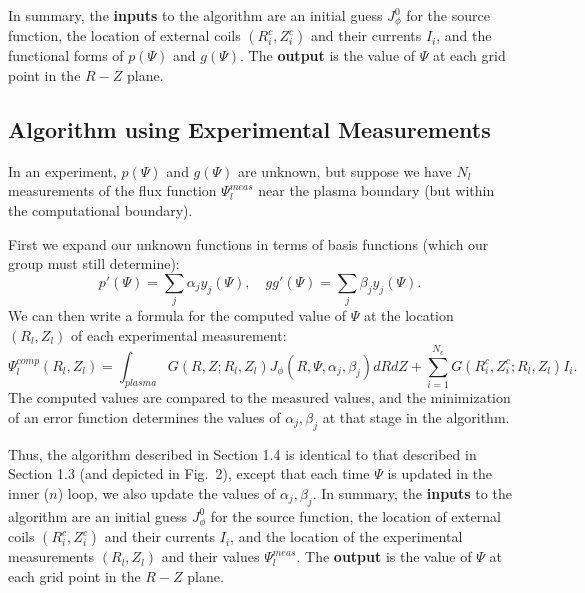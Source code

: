 \documentclass[paper=letter, fontsize=11pt]{scrartcl} %
\begin{document}
In summary, the \textbf{inputs} to the algorithm are an initial guess $J_\phi^0$ for the source function, the location of external coils $(R_i^c,Z_i^c)$ and their currents $I_i$, and the functional forms of $p(\Psi)$ and $g(\Psi)$.  The \textbf{output} is the value of $\Psi$ at each grid point in the $R-Z$ plane.  

\subsection{Algorithm using Experimental Measurements}

In an experiment, $p(\Psi)$ and $g(\Psi)$ are unknown, but suppose we have $N_l$ measurements of the flux function $\Psi_l^{meas}$ near the plasma boundary (but within the computational boundary).  

First we expand our unknown functions in terms of basis functions (which our group must still determine):
\begin{equation}
p'(\Psi) = \sum_j \alpha_j y_j(\Psi), \quad gg'(\Psi) = \sum_j \beta_j y_j(\Psi).
\end{equation}
We can then write a formula for the computed value of $\Psi$ at the location $(R_l, Z_l)$ of each experimental measurement: 
\begin{equation}
\Psi_l^{comp}(R_l, Z_l) = \int_{plasma} G(R,Z; R_l,Z_l) J_\phi(R,\Psi,\alpha_j,\beta_j) dR dZ + \sum_{i=1}^{N_c} G(R_i^c,Z_i^c; R_l,Z_l) I_i.
\end{equation}
The computed values are compared to the measured values, and the minimization of an error function determines the values of $\alpha_j, \beta_j$ at that stage in the algorithm.   

Thus, the algorithm described in Section 1.4 is identical to that described in Section 1.3 (and depicted in Fig.~2), except that each time $\Psi$ is updated in the inner ($n$) loop, we also update the values of $\alpha_j, \beta_j$.  In summary, the \textbf{inputs} to the algorithm are an initial guess $J_\phi^0$ for the source function, the location of external coils $(R_i^c,Z_i^c)$ and their currents $I_i$, and the location of the experimental measurements $(R_l,Z_l)$ and their values $\Psi_l^{meas}$.  The \textbf{output} is the value of $\Psi$ at each grid point in the $R-Z$ plane.  



\end{document}
